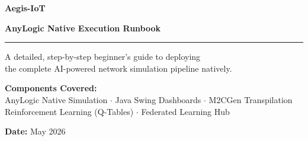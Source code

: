 \documentclass[12pt,a4paper]{article}
\begin{document}
\begin{titlepage}
\begin{center}
    \vspace*{2cm}
    
    
    \vspace{2cm}
    
    {\fontsize{36}{42}\selectfont\bfseries\color{primaryBlue} Aegis-IoT\par}
    \vspace{0.5cm}
    {\fontsize{18}{24}\selectfont\bfseries\color{textDark} AnyLogic Native Execution Runbook\par}
    
    \vspace{1cm}
    \rule{10cm}{2pt}
    \vspace{1cm}
    
    {\large A detailed, step-by-step beginner's guide to deploying \\ the complete AI-powered network simulation pipeline natively.\par}
    
    \vfill
    
    {\textbf{Components Covered:}\\
    AnyLogic Native Simulation $\cdot$ Java Swing Dashboards $\cdot$ M2CGen Transpilation \\
    Reinforcement Learning (Q-Tables) $\cdot$ Federated Learning Hub\par}
    
    \vspace{2cm}
    {\large \textbf{Date:} May 2026\par}
\end{center}
\end{titlepage}

\tableofcontents
\newpage

\end{document}
